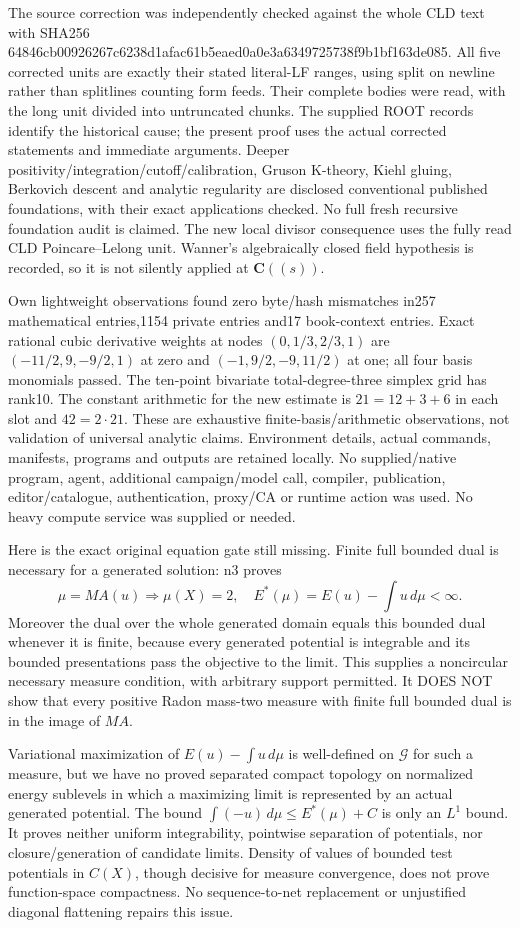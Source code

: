 \documentclass[11pt]{article}
\begin{document}
The source correction was independently checked against the whole CLD text with SHA256 64846cb00926267c6238d1afac61b5eaed0a0e3a6349725738f9b1bf163de085. All five corrected units are exactly their stated literal-LF ranges, using split on newline rather than splitlines counting form feeds. Their complete bodies were read, with the long unit divided into untruncated chunks. The supplied ROOT records identify the historical cause; the present proof uses the actual corrected statements and immediate arguments. Deeper positivity/integration/cutoff/calibration, Gruson K-theory, Kiehl gluing, Berkovich descent and analytic regularity are disclosed conventional published foundations, with their exact applications checked. No full fresh recursive foundation audit is claimed. The new local divisor consequence uses the fully read CLD Poincare--Lelong unit. Wanner's algebraically closed field hypothesis is recorded, so it is not silently applied at $\mathbf C((s))$.

Own lightweight observations found zero byte/hash mismatches in257 mathematical entries,1154 private entries and17 book-context entries. Exact rational cubic derivative weights at nodes $(0,1/3,2/3,1)$ are $(-11/2,9,-9/2,1)$ at zero and $(-1,9/2,-9,11/2)$ at one; all four basis monomials passed. The ten-point bivariate total-degree-three simplex grid has rank10. The constant arithmetic for the new estimate is $21=12+3+6$ in each slot and $42=2\cdot21$. These are exhaustive finite-basis/arithmetic observations, not validation of universal analytic claims. Environment details, actual commands, manifests, programs and outputs are retained locally. No supplied/native program, agent, additional campaign/model call, compiler, publication, editor/catalogue, authentication, proxy/CA or runtime action was used. No heavy compute service was supplied or needed.

Here is the exact original equation gate still missing. Finite full bounded dual is necessary for a generated solution: n3 proves
\[
 \mu=MA(u)\Longrightarrow\mu(X)=2,\quad E^*(\mu)=E(u)-\int u\,d\mu<\infty.
\]
Moreover the dual over the whole generated domain equals this bounded dual whenever it is finite, because every generated potential is integrable and its bounded presentations pass the objective to the limit. This supplies a noncircular necessary measure condition, with arbitrary support permitted. It DOES NOT show that every positive Radon mass-two measure with finite full bounded dual is in the image of $MA$.

Variational maximization of $E(u)-\int u\,d\mu$ is well-defined on $\mathcal G$ for such a measure, but we have no proved separated compact topology on normalized energy sublevels in which a maximizing limit is represented by an actual generated potential. The bound $\int(-u)\,d\mu\le E^*(\mu)+C$ is only an $L^1$ bound. It proves neither uniform integrability, pointwise separation of potentials, nor closure/generation of candidate limits. Density of values of bounded test potentials in $C(X)$, though decisive for measure convergence, does not prove function-space compactness. No sequence-to-net replacement or unjustified diagonal flattening repairs this issue.
\end{document}
